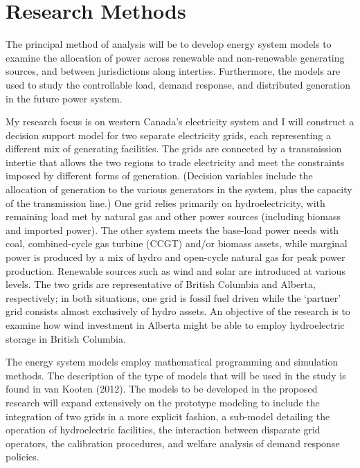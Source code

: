 \documentclass[10pt,letter]{article}
\begin{document}
\section{Research Methods }\label{research-methods}

The principal method of analysis will be to develop energy system models
to examine the allocation of power across renewable and non-renewable
generating sources, and between jurisdictions along interties.
Furthermore, the models are used to study the controllable load, demand
response, and distributed generation in the future power system.

My research focus is on western Canada's electricity system and I will
construct a decision support model for two separate electricity grids,
each representing a different mix of generating facilities. The grids
are connected by a transmission intertie that allows the two regions to
trade electricity and meet the constraints imposed by different forms of
generation. (Decision variables include the allocation of generation to
the various generators in the system, plus the capacity of the
transmission line.) One grid relies primarily on hydroelectricity, with
remaining load met by natural gas and other power sources (including
biomass and imported power). The other system meets the base-load power
needs with coal, combined-cycle gas turbine (CCGT) and/or biomass
assets, while marginal power is produced by a mix of hydro and
open-cycle natural gas for peak power production. Renewable sources such
as wind and solar are introduced at various levels. The two grids are
representative of British Columbia and Alberta, respectively; in both
situations, one grid is fossil fuel driven while the `partner' grid
consists almost exclusively of hydro assets. An objective of the
research is to examine how wind investment in Alberta might be able to
employ hydroelectric storage in British Columbia.

The energy system models employ mathematical programming and simulation
methods. The description of the type of models that will be used in the
study is found in van Kooten (2012). The models to be developed in the
proposed research will expand extensively on the prototype modeling to
include the integration of two grids in a more explicit fashion, a
sub-model detailing the operation of hydroelectric facilities, the
interaction between disparate grid operators, the calibration
procedures, and welfare analysis of demand response policies.
\end{document}
